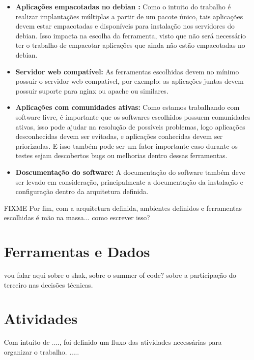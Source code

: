 \begin{itemize}
  \item  \textbf{Aplicações empacotadas no debian :}  Como o intuito do trabalho
  é realizar implantações múltiplas a partir de um pacote único, tais aplicações
  devem estar empacotadas e disponíveis para instalação nos servidores do debian.
  Isso impacta na escolha da ferramenta, visto que não será necessário ter o trabalho
  de empacotar aplicações que ainda não estão empacotadas no debian.
  \item  \textbf{Servidor web compatível:} As ferramentas escolhidas devem no
  mínimo possuir o servidor web compatível, por exemplo: as aplicações juntas
  devem possuir suporte para nginx ou apache ou similares.
  \item  \textbf{Aplicações com comunidades ativas:} Como estamos trabalhando
  com software livre, é importante que os softwares escolhidos possuem comunidades
  ativas, isso pode ajudar na resolução de  possíveis problemas, logo aplicações
  desconhecidas devem ser evitadas, e aplicações conhecidas devem ser priorizadas.
  E isso também pode ser um fator importante caso durante os testes sejam descobertos
  bugs ou melhorias dentro dessas ferramentas.
  \item  \textbf{Doscumentação do software:} A documentação do software também deve
  ser levado em consideração, principalmente a documentação da instalação e configuração
  dentro da arquitetura definida.
\end{itemize}

FIXME
Por fim, com a arquitetura definida, ambientes definidos e ferramentas escolhidas
é mão na massa... como escrever isso?

\section{Ferramentas e Dados}

vou falar aqui sobre o shak, sobre o summer of code? sobre a participação do terceiro
nas decisões técnicas.

\section{Atividades}

Com intuito de ...., foi definido um fluxo das atividades necessárias para organizar
o trabalho. .....

%
